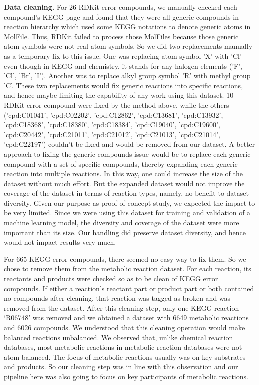 \documentclass{article}
\begin{document}
\textbf{Data cleaning.}
For 26 RDKit error compounds, we manually checked each compound's KEGG page and found that they were all generic compounds in reaction hierarchy which used some KEGG notations to denote generic atoms in MolFile. Thus, RDKit failed to process those MolFiles because those generic atom symbols were not real atom symbols. 
So we did two replacements manually as a temporary fix to this issue. 
One was replacing atom symbol 'X' with 'Cl' even though in KEGG and chemistry, it stands for any halogen elements ('F', 'Cl', 'Br', 'I'). 
Another was to replace alkyl group symbol 'R' with methyl group 'C'. 
These two replacements would fix generic reactions into specific reactions, and hence maybe limiting the capability of any work using this dataset. 
10 RDKit error compound were fixed by the method above, while the others
('cpd:C01041', 'cpd:C02202', 'cpd:C12862', 'cpd:C13681', 'cpd:C13932', 'cpd:C18368', 'cpd:C18380', 'cpd:C18384', 'cpd:C19040', 'cpd:C19600', 'cpd:C20442', 'cpd:C21011', 'cpd:C21012', 'cpd:C21013', 'cpd:C21014', 'cpd:C22197') couldn't be fixed and would be removed from our dataset. 
A better approach to fixing the generic compounds issue would be to replace each generic compound with a set of specific compounds, thereby expanding each generic reaction into multiple reactions. In this way, one could increase the size of the dataset without much effort. 
But the expanded dataset would not improve the coverage of the dataset in terms of reaction types, namely, no benefit to dataset diversity. 
Given our purpose as proof-of-concept study, we expected the impact to be very limited. 
Since we were using this dataset for training and validation of a machine learning model, the diversity and coverage of the dataset were more important than its size. 
Our handling did preserve dataset diversity, and hence would not impact results very much. 

For 665 KEGG error compounds, there seemed no easy way to fix them. So we chose to remove them from the metabolic reaction dataset.
For each reaction, its reactants and products were checked so as to be clean of KEGG error compounds. 
If either a reaction's reactant part or product part or both contained no compounds after cleaning, that reaction was tagged as broken and was removed from the dataset. 
After this cleaning step, only one KEGG reaction `R06748' was removed and we obtained a dataset with 6649 metabolic reactions and 6026 compounds. 
We understood that this cleaning operation would make balanced reactions unbalanced. 
We observed that, unlike chemical reaction databases, most metabolic reactions in metabolic reaction databases were not atom-balanced. 
The focus of metabolic reactions usually was on key substrates and products. So our cleaning step was in line with this observation and our pipeline here was also going to focus on key participants of metabolic reactions.   
\end{document}
